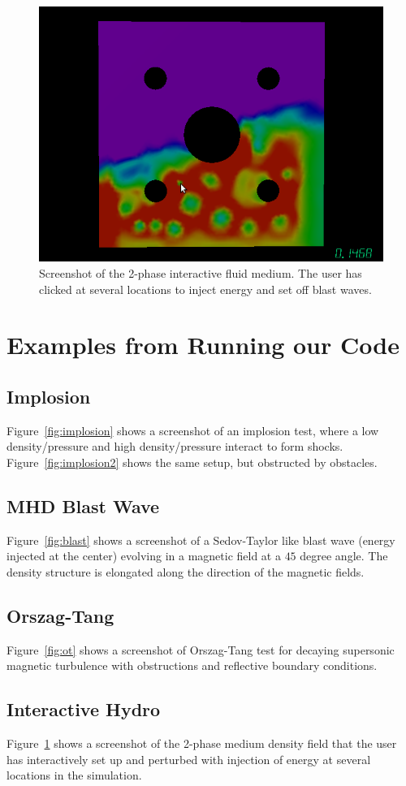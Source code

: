 \documentclass[12pt]{article}
\begin{document}
\begin{figure}[H!]
\centering
\includegraphics[width=0.8\linewidth]{HydroInteractive}
\caption{Screenshot of the 2-phase interactive fluid medium. The user has clicked at several locations to inject energy and set off blast waves.}
\label{fig:ih}
\end{figure}

\section{Examples from Running our Code}\label{sec:examples}

\subsection{Implosion}\label{sec:implosion}

Figure~\ref{fig:implosion} shows a screenshot of an implosion test, where a low density/pressure and high density/pressure interact to form shocks. Figure~\ref{fig:implosion2} shows the same setup, but obstructed by obstacles.

\subsection{MHD Blast Wave}\label{sec:blast}

Figure~\ref{fig:blast} shows a screenshot of a Sedov-Taylor like blast wave (energy injected at the center) evolving in a magnetic field at a $45$ degree angle. The density structure is elongated along the direction of the magnetic fields.

\subsection{Orszag-Tang}\label{sec:ot}

Figure~\ref{fig:ot} shows a screenshot of Orszag-Tang test for decaying supersonic magnetic turbulence with obstructions and reflective boundary conditions.

\subsection{Interactive Hydro}\label{sec:ih}

Figure~\ref{fig:ih} shows a screenshot of the 2-phase medium density field that the user has interactively set up and perturbed with injection of energy at several locations in the simulation.



\end{document}
